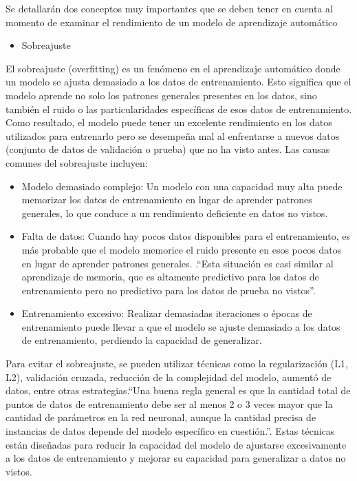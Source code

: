 Se detallarán dos conceptos muy importantes que se deben tener en cuenta al momento de examinar el rendimiento de un modelo de aprendizaje automático

\begin{itemize}
\item{Sobreajuste}
\end{itemize}


El sobreajuste (overfitting) es un fenómeno en el aprendizaje automático donde un modelo se ajusta demasiado a los datos de entrenamiento. Esto significa que el modelo aprende no solo los patrones generales presentes en los datos, sino también el ruido o las particularidades específicas de esos datos de entrenamiento. Como resultado, el modelo puede tener un excelente rendimiento en los datos utilizados para entrenarlo pero se desempeña mal al enfrentarse a nuevos datos (conjunto de datos de validación o prueba) que no ha visto antes. Las causas comunes del sobreajuste incluyen:

\begin{itemize}

	\item Modelo demasiado complejo: Un modelo con una capacidad muy alta puede memorizar los datos de entrenamiento en lugar de aprender patrones generales, lo que conduce a un rendimiento deficiente en datos no vistos.
	
	\item Falta de datos: Cuando hay pocos datos disponibles para el entrenamiento, es más probable que el modelo memorice el ruido presente en esos pocos datos en lugar de aprender patrones generales. .``Esta situación es casi similar al aprendizaje de memoria, que es altamente predictivo para los datos de entrenamiento pero no predictivo para los datos de prueba no vistos''\cite[p. 25]{aggarwal2018neural}.
	
	\item Entrenamiento excesivo: Realizar demasiadas iteraciones o épocas de entrenamiento puede llevar a que el modelo se ajuste demasiado a los datos de entrenamiento, perdiendo la capacidad de generalizar.

\end{itemize}

Para evitar el sobreajuste, se pueden utilizar técnicas como la regularización (L1, L2), validación cruzada, reducción de la complejidad del modelo, aumentó de datos, entre otras estrategias.``Una buena regla general es que la cantidad total de puntos de datos de entrenamiento debe ser al menos 2 o 3 veces mayor que la cantidad de parámetros en la red neuronal, aunque la cantidad precisa de instancias de datos depende del modelo específico en cuestión.''\cite[p. 25]{aggarwal2018neural}. Estas técnicas están diseñadas para reducir la capacidad del modelo de ajustarse excesivamente a los datos de entrenamiento y mejorar su capacidad para generalizar a datos no vistos.


